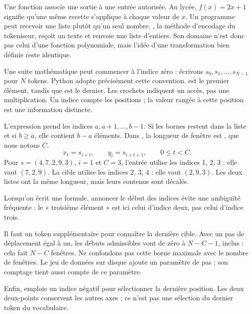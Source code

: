
Une fonction associe une sortie à une entrée autorisée. Au lycée,
\(f(x)=2x+1\) signifie qu'une même recette s'applique à chaque valeur
de \(x\). Un programme peut recevoir une liste plutôt qu'un seul nombre.
, la méthode d'encodage du tokeniseur,
reçoit un texte et renvoie
une liste d'entiers. Son domaine n'est donc pas celui d'une fonction
polynomiale, mais l'idée d'une transformation bien définie reste identique.

Une suite mathématique peut commencer à l'indice zéro : écrivons
\(s_0,s_1,\ldots,s_{N-1}\) pour \(N\) tokens. Python adopte précisément
cette convention.  est le premier élément, tandis que
 est le dernier. Les crochets indiquent un accès, pas une
multiplication. Un indice compte les positions ; la valeur rangée à cette
position est une information distincte.

L'expression  prend les indices \(a,a+1,\ldots,b-1\).
Si les bornes restent dans la liste et si \(b\geq a\), elle contient
\(b-a\) éléments. Dans , la longueur de fenêtre
est , que nous notons \(C\).
\[
 x_t=s_{i+t},\qquad y_t=s_{i+t+1},
 \qquad 0\leq t<C.
\]
Pour \(s=(4,7,2,9,3)\), \(i=1\) et \(C=3\), l'entrée utilise les
indices 1, 2, 3 : elle vaut \((7,2,9)\). La cible utilise les indices
2, 3, 4 : elle vaut \((2,9,3)\). Les deux listes ont la même longueur,
mais leurs contenus sont décalés.

Lorsqu'on écrit une formule, annoncer le début des indices évite
une ambiguïté fréquente : le « troisième élément » est ici
celui d'indice deux, pas celui d'indice trois.

Il faut un token supplémentaire pour connaître la dernière cible.
Avec un pas de déplacement égal à un, les débuts admissibles vont
de zéro à \(N-C-1\), inclus : cela fait \(N-C\) fenêtres.
Ne confondons pas cette borne maximale avec le nombre de fenêtres.
Le jeu de données sur disque ajoute un paramètre de pas ; son comptage
tient aussi compte de ce paramètre.

Enfin,  emploie un indice négatif pour sélectionner
la dernière position. Les deux deux-points conservent les autres axes :
ce n'est pas une sélection du dernier token du vocabulaire.

